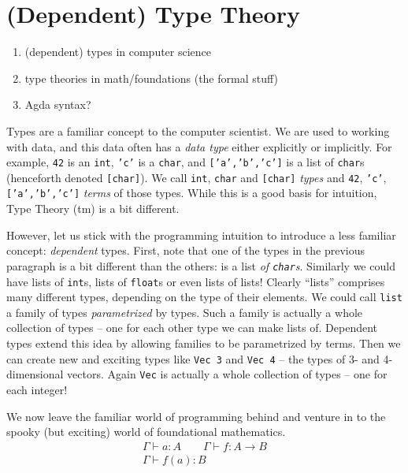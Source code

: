 \section{(Dependent) Type Theory}\label{sec/typetheory}
\begin{enumerate}
  \item (dependent) types in computer science
  \item type theories in math/foundations (the formal stuff)
  \item Agda syntax?
\end{enumerate}

Types are a familiar concept to the computer scientist. We are used to working
with data, and this data often has a \emph{data type} either explicitly or
implicitly. For example, \texttt{42} is an \texttt{int}, \texttt{'c'} is a
\texttt{char}, and \texttt{['a','b','c']} is a list of \texttt{char}s (henceforth
denoted \texttt{[char]}). We call
\texttt{int}, \texttt{char} and \texttt{[char]} \emph{types} and
\texttt{42}, \texttt{'c'}, \texttt{['a','b','c']} \emph{terms} of those types.
While this is a good basis for intuition, Type Theory (tm) is a bit different.

However, let us stick with the programming intuition to introduce a less
familiar concept: \emph{dependent} types. First, note that one of the types in
the previous paragraph is a bit different than the others: \text{['a','b','c']} is a
list \emph{of \texttt{char}s}. Similarly we could have lists of \texttt{int}s,
lists of \texttt{float}s or even lists of lists! Clearly ``lists'' comprises
many different types, depending on the type of their elements. We could call
\texttt{list} a family of types \emph{parametrized} by types. Such a family is
actually a whole collection of types -- one for each other type we can make
lists of.
Dependent types extend this idea by allowing families to be parametrized by
terms. Then we can create new and exciting types like \texttt{Vec 3} and
\texttt{Vec 4} -- the types of 3- and 4-dimensional vectors. Again \texttt{Vec} is
actually a whole collection of types -- one for each integer!

We now leave the familiar world of programming behind and venture in to the spooky
(but exciting) world of foundational mathematics.
\begin{equation}
  \begin{array}{c}
    \Gamma \vdash a : A \qquad \Gamma \vdash f : A \rightarrow B\\
    \hline
    \Gamma \vdash f(a) : B
  \end{array}
  \label{rule:example}
\end{equation}

